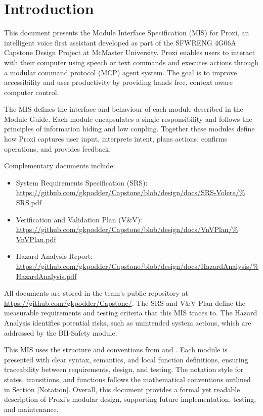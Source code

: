 \documentclass[12pt, titlepage]{article}
\begin{document}

\section{Introduction}
\noindent This document presents the Module Interface Specification (MIS) for
Proxi, an intelligent voice first assistant developed as part of the
SFWRENG 4G06A Capstone Design Project at McMaster University.
Proxi enables users to interact with their computer using speech or
text commands and executes actions through a modular command protocol
(MCP) agent system. The goal is to improve accessibility and user
productivity by providing hands free, context aware computer control.

\vspace{0.5cm}
\noindent The MIS defines the interface and behaviour of each module described
in the Module Guide. Each module encapsulates a single responsibility and
follows the principles of information hiding and low coupling. Together these
modules define how Proxi captures user input, interprets intent, plans actions,
confirms operations, and provides feedback.

\vspace{0.5cm}
\noindent Complementary documents include:
\begin{itemize}
  \item System Requirements Specification (SRS):
  \url{https://github.com/gkpodder/Capstone/blob/design/docs/SRS-Volere/%
SRS.pdf}
  \item Verification and Validation Plan (V\&V):
  \url{https://github.com/gkpodder/Capstone/blob/design/docs/VnVPlan/%
VnVPlan.pdf}
  \item Hazard Analysis Report:
  \url{https://github.com/gkpodder/Capstone/blob/design/docs/HazardAnalysis/%
HazardAnalysis.pdf}
\end{itemize}

\noindent All documents are stored in the team’s public repository at
\url{https://github.com/gkpodder/Capstone/}.
The SRS and V\&V Plan define the measurable requirements and testing
criteria that this MIS traces to. The Hazard Analysis identifies
potential risks, such as unintended system actions, which are addressed
by the BH-Safety module.

\noindent This MIS uses the structure and conventions from
\citet{HoffmanAndStrooper1995} and \citet{GhezziEtAl2003}. Each module is
presented with clear syntax, semantics, and local function definitions,
ensuring traceability between requirements, design, and testing. The notation
style for states, transitions, and functions follows the mathematical
conventions outlined in Section \ref{Notation}. Overall, this document provides
a formal yet readable description of Proxi’s modular design, supporting future
implementation, testing, and maintenance.
\end{document}
